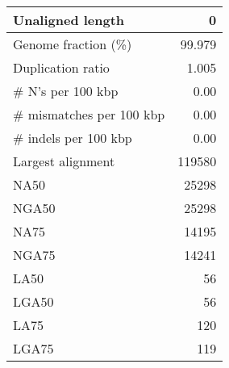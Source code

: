 \documentclass[12pt,a4paper]{article}
\begin{document}
\begin{table}[ht]
\begin{center}
\begin{tabular}{|l*{1}{|r}|}
Unaligned length & 0 \\ \hline
Genome fraction (\%) & 99.979 \\ \hline
Duplication ratio & 1.005 \\ \hline
\# N's per 100 kbp & 0.00 \\ \hline
\# mismatches per 100 kbp & 0.00 \\ \hline
\# indels per 100 kbp & 0.00 \\ \hline
Largest alignment & 119580 \\ \hline
NA50 & 25298 \\ \hline
NGA50 & 25298 \\ \hline
NA75 & 14195 \\ \hline
NGA75 & 14241 \\ \hline
LA50 & 56 \\ \hline
LGA50 & 56 \\ \hline
LA75 & 120 \\ \hline
LGA75 & 119 \\ \hline
\end{tabular}
\end{center}
\end{table}
\end{document}
